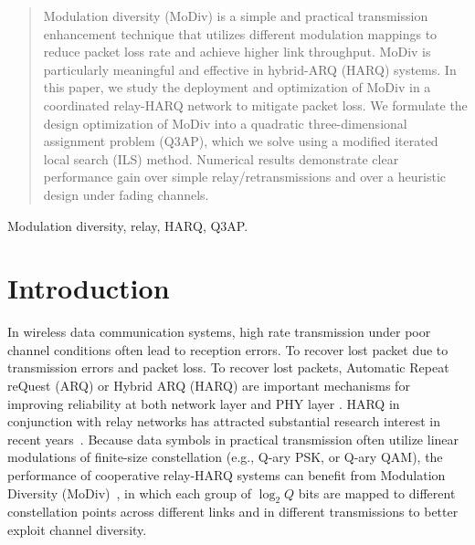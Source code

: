 \documentclass[journal]{IEEEtran}
\begin{document}
\begin{abstract}
Modulation diversity (MoDiv) is a simple and practical transmission enhancement
technique that utilizes different modulation mappings to reduce packet loss rate
and achieve higher link throughput. MoDiv is particularly meaningful and
effective in hybrid-ARQ (HARQ) systems. In this paper, we study the deployment
and optimization of MoDiv in a coordinated relay-HARQ network to mitigate packet
loss.
We formulate the design optimization of MoDiv into a quadratic three-dimensional
assignment problem (Q3AP), which we solve using a modified iterated local search
(ILS) method. Numerical results demonstrate clear performance gain over simple
relay/retransmissions and over a heuristic design under fading channels.
\end{abstract}

\begin{IEEEkeywords}
    Modulation diversity, relay, HARQ, Q3AP.
\end{IEEEkeywords}

%
\IEEEpeerreviewmaketitle


\section{Introduction}
In wireless data communication systems, high rate transmission under poor
channel conditions often lead to reception errors. To recover lost packet due to
transmission errors and packet loss. To recover lost packets, Automatic Repeat
reQuest (ARQ) or Hybrid ARQ (HARQ) are important mechanisms for improving
reliability at both network layer \cite{TS36.331} and PHY layer \cite{TS36.213}.
HARQ in conjunction with relay networks has attracted substantial research
interest in recent years~\cite{ngo2014hybrid}. Because data symbols in practical
transmission often utilize linear modulations of finite-size
constellation (e.g., Q-ary PSK, or Q-ary QAM), the performance of cooperative relay-HARQ systems can benefit from Modulation Diversity
(MoDiv)~\cite{benelli1992new}, in which each group of $\log_2 Q$ bits are mapped
to different constellation points across different links and in different
transmissions to better exploit channel diversity.
\end{document}

